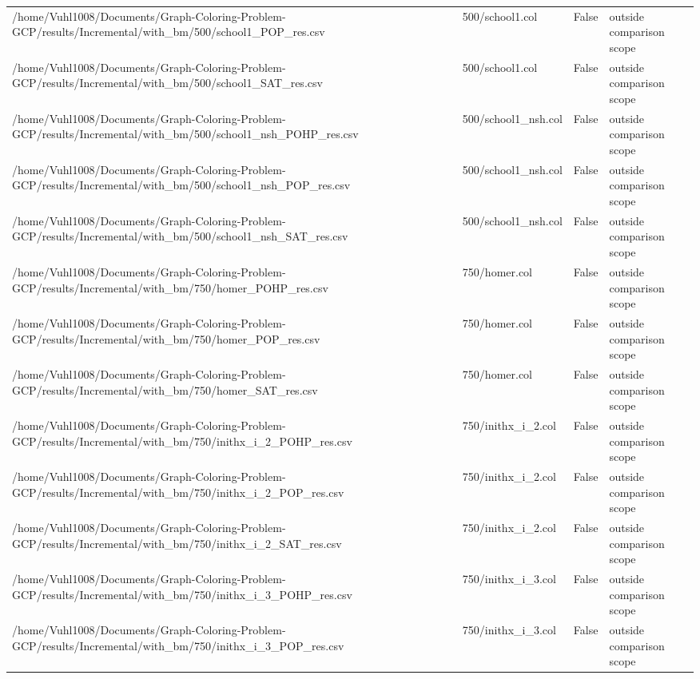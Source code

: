 \begin{table}[htbp]
\begin{tabular}{llll}
/home/Vuhl1008/Documents/Graph-Coloring-Problem-GCP/results/Incremental/with\_bm/500/school1\_POP\_res.csv & 500/school1.col & False & outside comparison scope \\
/home/Vuhl1008/Documents/Graph-Coloring-Problem-GCP/results/Incremental/with\_bm/500/school1\_SAT\_res.csv & 500/school1.col & False & outside comparison scope \\
/home/Vuhl1008/Documents/Graph-Coloring-Problem-GCP/results/Incremental/with\_bm/500/school1\_nsh\_POHP\_res.csv & 500/school1\_nsh.col & False & outside comparison scope \\
/home/Vuhl1008/Documents/Graph-Coloring-Problem-GCP/results/Incremental/with\_bm/500/school1\_nsh\_POP\_res.csv & 500/school1\_nsh.col & False & outside comparison scope \\
/home/Vuhl1008/Documents/Graph-Coloring-Problem-GCP/results/Incremental/with\_bm/500/school1\_nsh\_SAT\_res.csv & 500/school1\_nsh.col & False & outside comparison scope \\
/home/Vuhl1008/Documents/Graph-Coloring-Problem-GCP/results/Incremental/with\_bm/750/homer\_POHP\_res.csv & 750/homer.col & False & outside comparison scope \\
/home/Vuhl1008/Documents/Graph-Coloring-Problem-GCP/results/Incremental/with\_bm/750/homer\_POP\_res.csv & 750/homer.col & False & outside comparison scope \\
/home/Vuhl1008/Documents/Graph-Coloring-Problem-GCP/results/Incremental/with\_bm/750/homer\_SAT\_res.csv & 750/homer.col & False & outside comparison scope \\
/home/Vuhl1008/Documents/Graph-Coloring-Problem-GCP/results/Incremental/with\_bm/750/inithx\_i\_2\_POHP\_res.csv & 750/inithx\_i\_2.col & False & outside comparison scope \\
/home/Vuhl1008/Documents/Graph-Coloring-Problem-GCP/results/Incremental/with\_bm/750/inithx\_i\_2\_POP\_res.csv & 750/inithx\_i\_2.col & False & outside comparison scope \\
/home/Vuhl1008/Documents/Graph-Coloring-Problem-GCP/results/Incremental/with\_bm/750/inithx\_i\_2\_SAT\_res.csv & 750/inithx\_i\_2.col & False & outside comparison scope \\
/home/Vuhl1008/Documents/Graph-Coloring-Problem-GCP/results/Incremental/with\_bm/750/inithx\_i\_3\_POHP\_res.csv & 750/inithx\_i\_3.col & False & outside comparison scope \\
/home/Vuhl1008/Documents/Graph-Coloring-Problem-GCP/results/Incremental/with\_bm/750/inithx\_i\_3\_POP\_res.csv & 750/inithx\_i\_3.col & False & outside comparison scope \\

\end{tabular}
\end{table}
